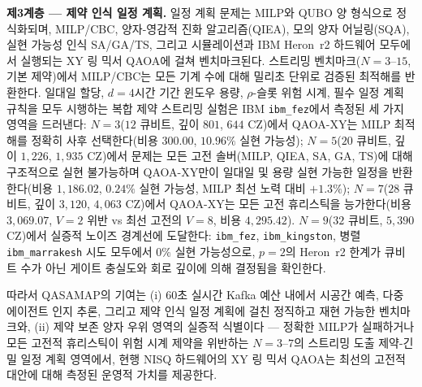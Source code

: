 \textbf{제3계층 --- 제약 인식 일정 계획.} 일정 계획 문제는 MILP와 QUBO 양 형식으로 정식화되며, MILP/CBC, 양자-영감적 진화 알고리즘(QIEA), 모의 양자 어닐링(SQA), 실현 가능성 인식 SA/GA/TS, 그리고 시뮬레이션과 IBM Heron~r2 하드웨어 모두에서 실행되는 XY 링 믹서 QAOA에 걸쳐 벤치마크된다. 스트리밍 벤치마크($N=3$--$15$, 기본 제약)에서 MILP/CBC는 모든 기계 수에 대해 밀리초 단위로 검증된 최적해를 반환한다. 일대일 할당, $d=4$시간 기간 윈도우 용량, $\rho$-슬롯 위험 시계, 필수 일정 계획 규칙을 모두 시행하는 복합 제약 스트리밍 실험은 IBM \texttt{ibm\_fez}에서 측정된 세 가지 영역을 드러낸다: $N=3$($12$ 큐비트, 깊이 $801$, $644$ CZ)에서 QAOA-XY는 MILP 최적해를 정확히 사후 선택한다(비용 $300.00$, $10.96\%$ 실현 가능성); $N=5$($20$ 큐비트, 깊이 $1{,}226$, $1{,}935$ CZ)에서 문제는 모든 고전 솔버(MILP, QIEA, SA, GA, TS)에 대해 구조적으로 실현 불가능하며 QAOA-XY만이 일대일 및 용량 실현 가능한 일정을 반환한다(비용 $1{,}186.02$, $0.24\%$ 실현 가능성, MILP 최선 노력 대비 $+1.3\%$); $N=7$($28$ 큐비트, 깊이 $3{,}120$, $4{,}063$ CZ)에서 QAOA-XY는 모든 고전 휴리스틱을 능가한다(비용 $3{,}069.07$, $V=2$ 위반 vs 최선 고전의 $V=8$, 비용 $4{,}295.42$). $N=9$($32$ 큐비트, $5{,}390$ CZ)에서 실증적 노이즈 경계선에 도달한다: \texttt{ibm\_fez}, \texttt{ibm\_kingston}, 병렬 \texttt{ibm\_marrakesh} 시도 모두에서 $0\%$ 실현 가능성으로, $p=2$의 Heron~r2 한계가 큐비트 수가 아닌 게이트 충실도와 회로 깊이에 의해 결정됨을 확인한다.

따라서 QASAMAP의 기여는 (i) 60초 실시간 Kafka 예산 내에서 시공간 예측, 다중 에이전트 인지 추론, 그리고 제약 인식 일정 계획에 걸친 정직하고 재현 가능한 벤치마크와, (ii) 제약 보존 양자 우위 영역의 실증적 식별이다 --- 정확한 MILP가 실패하거나 모든 고전적 휴리스틱이 위험 시계 제약을 위반하는 $N=3$--$7$의 스트리밍 도출 제약-긴밀 일정 계획 영역에서, 현행 NISQ 하드웨어의 XY 링 믹서 QAOA는 최선의 고전적 대안에 대해 측정된 운영적 가치를 제공한다.
